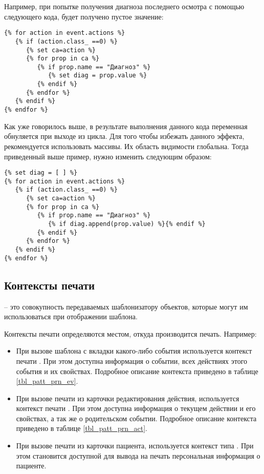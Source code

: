 Например, при попытке получения диагноза последнего осмотра с помощью следующего кода, будет получено пустое значение:
\begin{verbatim}
{% for action in event.actions %}
   {% if (action.class_ ==0) %}
      {% set ca=action %}
      {% for prop in ca %} 
         {% if prop.name == "Диагноз" %}
            {% set diag = prop.value %}
         {% endif %}
      {% endfor %}
   {% endif %}
{% endfor %}
\end{verbatim}

Как уже говорилось выше, в результате выполнения данного кода переменная  обнуляется при выходе из цикла. Для того чтобы избежать данного эффекта, рекомендуется использовать массивы. Их область видимости глобальна. Тогда приведенный выше пример, нужно изменить следующим образом:
\begin{verbatim}
{% set diag = [ ] %}
{% for action in event.actions %}
   {% if (action.class_ ==0) %}
      {% set ca=action %}
      {% for prop in ca %} 
         {% if prop.name == "Диагноз" %}
            {% if diag.append(prop.value) %}{% endif %}
         {% endif %}
      {% endfor %}
   {% endif %}
{% endfor %}
\end{verbatim}

\subsection{Контексты печати} 

 – это совокупность передаваемых шаблонизатору объектов, которые могут им использоваться при отображении шаблона.

Контексты печати определяются местом, откуда производится печать. Например:
\begin{itemize}
 \item При вызове шаблона с вкладки  какого-либо события используется контекст печати . При этом доступна информация о событии, всех действиях этого события и их свойствах. Подробное описание контекста  приведено в таблице  \ref{tbl_patt_prn_ev}.
 \item При вызове печати из карточки редактирования действия, используется контекст печати . При этом доступна информация о текущем действии и его свойствах, а так же о родительском событии. Подробное описание контекста  приведено в таблице \ref{tbl_patt_prn_act}.
 \item При вызове печати из карточки пациента, используется контекст  типа . При этом становится доступной для вывода на печать персональная информация о пациенте.
\end{itemize}
 
